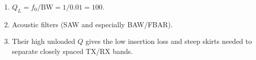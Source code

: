 \begin{enumerate}[leftmargin=1.6em,itemsep=2pt]
\item $Q_L = f_0/\text{BW} = 1/0.01 = 100$.
\item Acoustic filters (SAW and especially BAW/FBAR).
\item Their high unloaded $Q$ gives the low insertion loss and steep skirts needed to separate closely spaced TX/RX bands.
\end{enumerate}
